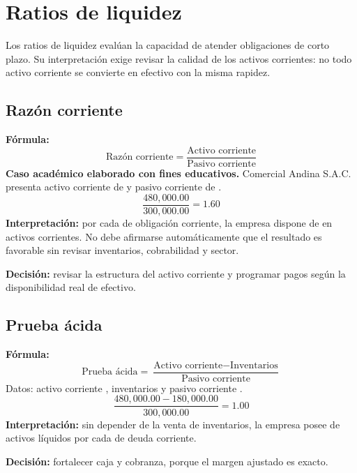 \section{Ratios de liquidez}
Los ratios de liquidez evalúan la capacidad de atender obligaciones de corto plazo. Su interpretación exige revisar la calidad de los activos corrientes: no todo activo corriente se convierte en efectivo con la misma rapidez.

\subsection{Razón corriente}
\textbf{Fórmula:}
\[
\text{Razón corriente}=\frac{\text{Activo corriente}}{\text{Pasivo corriente}}
\]
\textbf{Caso académico elaborado con fines educativos.} Comercial Andina S.A.C. presenta activo corriente de  y pasivo corriente de .
\[
\frac{480,000.00}{300,000.00}=1.60
\]
\textbf{Interpretación:} por cada  de obligación corriente, la empresa dispone de  en activos corrientes. No debe afirmarse automáticamente que el resultado es favorable sin revisar inventarios, cobrabilidad y sector.

\textbf{Decisión:} revisar la estructura del activo corriente y programar pagos según la disponibilidad real de efectivo.

\newpage
\subsection{Prueba ácida}
\textbf{Fórmula:}
\[
\text{Prueba ácida}=\frac{\text{Activo corriente}-\text{Inventarios}}{\text{Pasivo corriente}}
\]
Datos: activo corriente , inventarios  y pasivo corriente .
\[
\frac{480,000.00-180,000.00}{300,000.00}=1.00
\]
\textbf{Interpretación:} sin depender de la venta de inventarios, la empresa posee  de activos líquidos por cada  de deuda corriente.

\textbf{Decisión:} fortalecer caja y cobranza, porque el margen ajustado es exacto.
